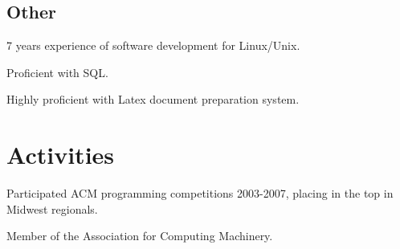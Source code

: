 \documentclass{resume}
\begin{document}
\subsection{Other}
\begin{compactitem}
  \item 7 years experience of software development for Linux/Unix.
  \item Proficient with SQL. 
  \item Highly proficient with Latex document preparation system.
\end{compactitem}

\section{Activities}

\begin{compactitem}
  \item Participated ACM programming competitions 2003-2007, placing in the top in Midwest regionals.
  \item Member of the Association for Computing Machinery.
\end{compactitem}
\end{document}
